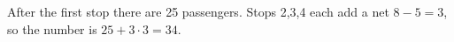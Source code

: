 After the first stop there are 25 passengers. Stops 2,3,4 each add a net $8-5=3$, so the number is $25+3\cdot3=\boxed{34}$.

